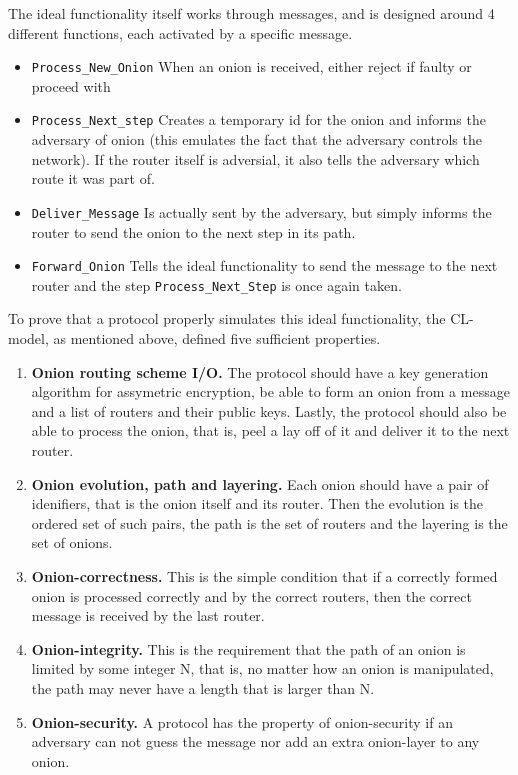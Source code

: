 The ideal functionality itself works through messages, and is
designed around 4 different functions, each activated by a specific
message\cite{CL-model}.
\begin{itemize}
  \item{{\tt Process_New_Onion} When an onion is received, either
    reject if faulty or proceed with}
  \item{{\tt Process_Next_step} Creates a temporary id for the onion
    and informs the adversary of onion (this emulates the fact that
    the adversary controls the network). If the router itself is
    adversial, it also tells the adversary which route it was part
    of. }
  \item{{\tt Deliver_Message} Is actually sent by the adversary, but
    simply informs the router to send the onion to the next step in
    its path.}
  \item{{\tt Forward_Onion} Tells the ideal functionality to send the
    message to the next router and the step {\tt Process_Next_Step} is
    once again taken.}
\end{itemize}

To prove that a protocol properly simulates this ideal functionality,
the CL-model, as mentioned above, defined five sufficient properties\cite{CL-model}.

\begin{enumerate}
  \item{{\bf Onion routing scheme I/O.} The protocol should have a key
  generation algorithm for assymetric encryption, be able to form an
  onion from a message and a list of routers and their public
  keys. Lastly, the protocol should also be able to process the onion,
  that is, peel a lay off of it and deliver it to the next router.}

  \item{{\bf Onion evolution, path and layering.} Each onion should
    have a pair of idenifiers, that is the onion itself and its
    router. Then the evolution is the ordered set of such pairs, the path is
    the set of routers and the layering is the set of onions.}

  \item{{\bf Onion-correctness.} This is the simple condition that if a
  correctly formed onion is processed correctly and by the correct
  routers, then the correct message is received by the last router.}

  \item{{\bf Onion-integrity.} This is the requirement that the path of
  an onion is limited by some integer N, that is, no matter how an
  onion is manipulated, the path may never have a length that is
  larger than N.}

  \item{{\bf Onion-security.} A protocol has the property of
    onion-security if an adversary can not guess the message nor add
    an extra onion-layer to any onion.}
\end{enumerate}


